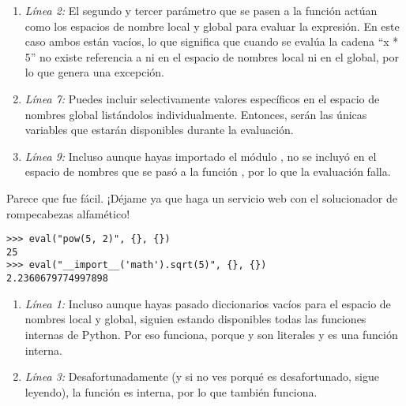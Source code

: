 \begin{enumerate}

\item \emph{Línea 2:} El segundo y tercer parámetro que se pasen a la función  actúan como los espacios de nombre local y global para evaluar la expresión. En este caso ambos están vacíos, lo que significa que cuando se evalúa la cadena ``x * 5'' no existe referencia a  ni en el espacio de nombres local ni en el global, por lo que  genera una excepción.

\item \emph{Línea 7:} Puedes incluir selectivamente valores específicos en el espacio de nombres global listándolos individualmente. Entonces, serán las únicas variables que estarán disponibles durante la evaluación.

\item \emph{Línea 9:} Incluso aunque hayas importado el módulo , no se incluyó en el espacio de nombres que se pasó a la función , por lo que la evaluación falla.

\end{enumerate}

Parece que fue fácil. ¡Déjame ya que haga un servicio web con el solucionador de rompecabezas alfamético!

\noindent\begin{minipage}{\textwidth}
\begin{lstlisting}[mathescape=True]
>>> eval("pow(5, 2)", {}, {})
25
>>> eval("__import__('math').sqrt(5)", {}, {})
2.2360679774997898
\end{lstlisting}
\end{minipage}

\begin{enumerate}

\item \emph{Línea 1:} Incluso aunque hayas pasado diccionarios vacíos para el espacio de nombres local y global, siguien estando disponibles todas las funciones internas de Python. Por eso  funciona, porque  y  son literales y  es una función interna.

\item \emph{Línea 3:} Desafortunadamente (y si no ves porqué es desafortunado, sigue leyendo), la función  es interna, por lo que también funciona.

\end{enumerate}

